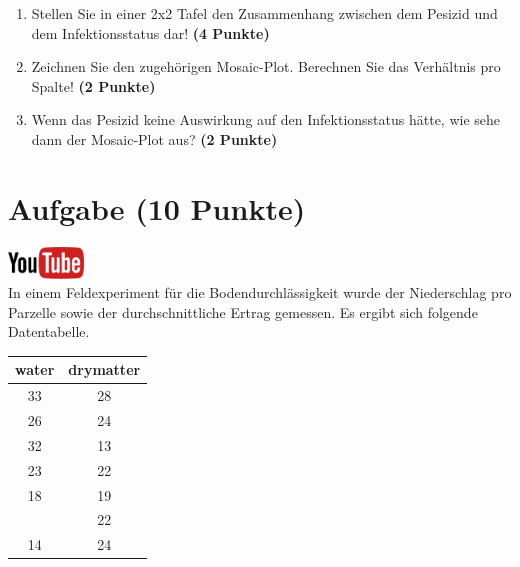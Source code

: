 \documentclass[a4paper, 10pt]{scrartcl}\usepackage[]{graphicx}\usepackage[]{xcolor}
\begin{document}
\begin{enumerate}
\item Stellen Sie in einer 2x2 Tafel den Zusammenhang zwischen dem
  Pesizid und dem Infektionsstatus dar! \textbf{(4 Punkte)}
\item Zeichnen Sie den zugeh{\"o}rigen Mosaic-Plot. Berechnen Sie das
  Verh{\"a}ltnis pro Spalte! \textbf{(2 Punkte)}
\item Wenn das Pesizid keine Auswirkung auf den Infektionsstatus h{\"a}tte, wie
  sehe dann der Mosaic-Plot aus? \textbf{(2 Punkte)}
\end{enumerate} 
\clearpage

\section{Aufgabe \hfill (10 Punkte)}

\hfill\href{https://youtu.be/VAqiUdV4WQ0}{\includegraphics[width =
  2cm]{img/youtube}}\\[1Ex]

In einem Feldexperiment f{\"u}r die Bodendurchl{\"a}ssigkeit wurde der Niederschlag
pro Parzelle sowie der durchschnittliche Ertrag gemessen. Es ergibt sich
folgende Datentabelle. 

\begin{table}[!h]
\centering
\begin{tabular}{cc}
\toprule
water & drymatter\\
\midrule
33 & 28\\
26 & 24\\
32 & 13\\
23 & 22\\
18 & 19\\
\addlinespace
23 & 22\\
14 & 24\\
\bottomrule
\end{tabular}
\end{table}
\end{document}
